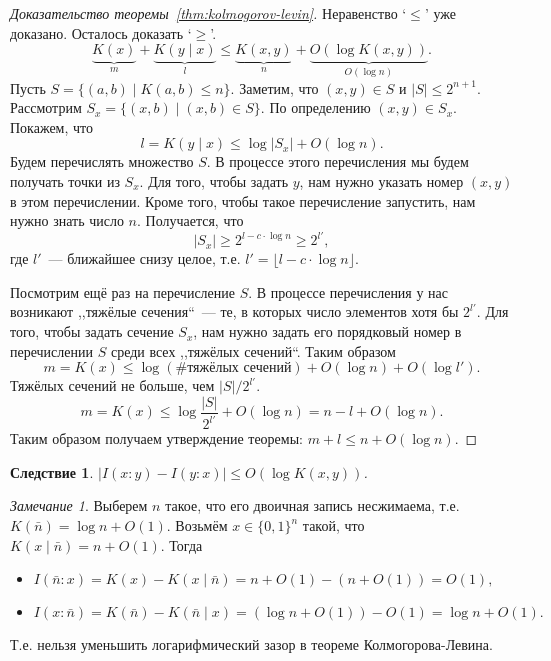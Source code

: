 \documentclass[12pt]{article}
\theoremstyle{definition}
\theoremstyle{plain}
\newtheorem{corollary}{Следствие}[section]
\theoremstyle{remark}
\newtheorem{remark}{Замечание}[section]
\begin{document}
\begin{proof}[Доказательство теоремы~\ref{thm:kolmogorov-levin}] Неравенство `$\le$' уже
    доказано. Осталось доказать `$\ge$'.
    \[
    \underbrace{K(x)}_{m} + \underbrace{K(y\mid x)}_l \le \underbrace{K(x,y)}_n
    + \underbrace{O(\log K(x,y))}_{O(\log n)}.
    \]
    Пусть $S = \{( a,b) \mid K(a,b)\le n\}$. Заметим, что $(
    x,y)\in S$ и $|S|\le 2^{n+1}$. 
    Рассмотрим $S_x = \{( x,b) \mid ( x,b) \in S\}$.
    По определению $( x,y)\in S_x$.
    Покажем, что 
    \[
        l = K(y\mid x)\le \log|S_x| + O(\log n).
    \]
    Будем перечислять множество $S$. В процессе этого перечисления мы будем
    получать точки из $S_x$. Для того, чтобы задать $y$, нам нужно указать
    номер $( x,y )$ в этом перечислении. Кроме того, чтобы такое
    перечисление запустить, нам нужно знать число $n$. Получается, что
    \[|S_x| \ge 2^{l - c\cdot\log n} \ge 2^{l'},\]
    где $l'$~--- ближайшее снизу целое, т.е. $l' = \lfloor l - c\cdot\log n\rfloor$.

    Посмотрим ещё раз на перечисление $S$. В процессе перечисления у нас
    возникают ,,тяжёлые сечения``~--- те, в которых число элементов хотя бы
    $2^{l'}$. Для того, чтобы задать сечение $S_x$, нам нужно задать его
    порядковый номер в перечислении $S$ среди всех ,,тяжёлых сечений``. Таким
    образом
    \[
        m = K(x) \le \log(\text{\# тяжёлых сечений}) + O(\log n) + O(\log l').
    \]
    Тяжёлых сечений не больше, чем $|S|/2^{l'}$.
    \[
        m = K(x) \le \log\frac{|S|}{2^{l'}} + O(\log n) = n - l + O(\log n).
    \]
    Таким образом получаем утверждение теоремы: $m + l \le n + O(\log n)$.
\end{proof}
\begin{corollary}
    $|I(x:y) - I(y:x)|\le O(\log K(x,y))$.
\end{corollary}
\begin{remark}
    Выберем $n$ такое, что его двоичная запись несжимаема, 
    т.е. $K(\bar n) = \log n + O(1)$. Возьмём $x\in\{0,1\}^n$ такой, что
    $K(x\mid \bar n) = n + O(1)$. Тогда
    \begin{itemize}
    \item\(
        I(\bar n : x) = K(x) - K(x\mid\bar n) = n + O(1) - (n + O(1)) = O(1),
    \)
    \item\(
        I(x : \bar n) = K(\bar n) - K(\bar n\mid x) = (\log n + O(1)) - O(1) = \log n + O(1).
    \)
    \end{itemize}
    Т.е. нельзя уменьшить логарифмический зазор в теореме Колмогорова-Левина.
\end{remark}
\end{document}
